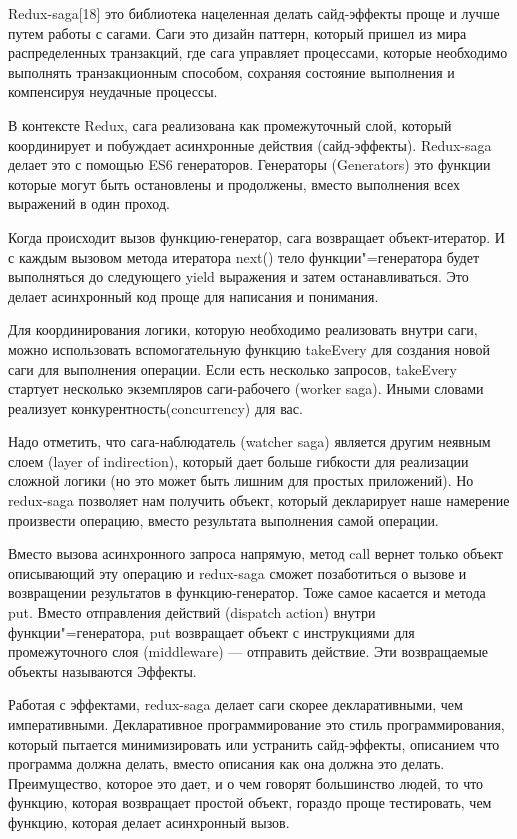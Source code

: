 Redux-saga[18] это библиотека нацеленная делать сайд-эффекты проще и лучше путем работы с сагами.
Саги это дизайн паттерн, который пришел из мира распределенных транзакций, где сага управляет процессами, которые необходимо выполнять транзакционным способом, сохраняя состояние выполнения и компенсируя неудачные процессы.

В контексте Redux, сага реализована как промежуточный слой, который координирует и побуждает асинхронные действия (сайд-эффекты).
Redux-saga делает это с помощью ES6 генераторов.
Генераторы (Generators) это функции которые могут быть остановлены и продолжены, вместо выполнения всех выражений в один проход.

Когда происходит вызов функцию-генератор, сага возвращает объект-итератор.
И с каждым вызовом метода итератора next() тело функции"=генератора будет выполняться до следующего yield выражения и затем останавливаться.
Это делает асинхронный код проще для написания и понимания.

Для координирования логики, которую необходимо реализовать внутри саги, можно использовать вспомогательную функцию takeEvery для создания новой саги для выполнения операции.
Если есть несколько запросов, takeEvery стартует несколько экземпляров саги-рабочего (worker saga).
Иными словами реализует конкурентность(concurrency) для вас.

Надо отметить, что сага-наблюдатель (watcher saga) является другим неявным слоем (layer of indirection), который дает больше гибкости для реализации сложной логики (но это может быть лишним для простых приложений).
Но redux-saga позволяет нам получить объект, который декларирует наше намерение произвести операцию, вместо результата выполнения самой операции.

Вместо вызова асинхронного запроса напрямую, метод call вернет только объект описывающий эту операцию и redux-saga сможет позаботиться о вызове и возвращении результатов в функцию-генератор.
Тоже самое касается и метода put.
Вместо отправления действий (dispatch action) внутри функции"=генератора, put возвращает объект с инструкциями для промежуточного слоя (middleware) — отправить действие.
Эти возвращаемые объекты называются Эффекты.

Работая с эффектами, redux-saga делает саги скорее декларативными, чем императивными.
Декларативное программирование это стиль программирования, который пытается минимизировать или устранить сайд-эффекты, описанием что программа должна делать, вместо описания как она должна это делать.
Преимущество, которое это дает, и о чем говорят большинство людей, то что функцию, которая возвращает простой объект, гораздо проще тестировать, чем функцию, которая делает асинхронный вызов.
